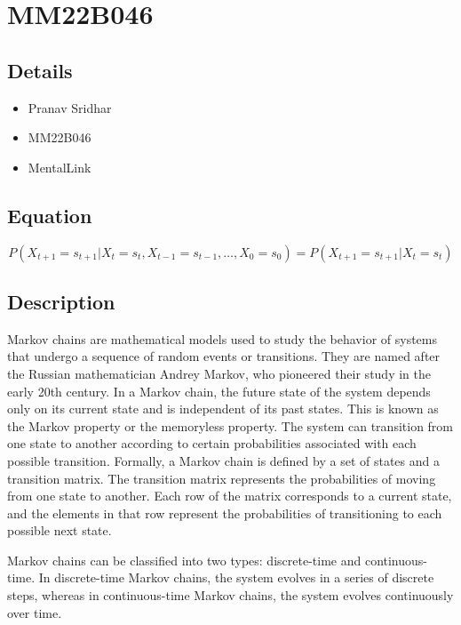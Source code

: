 \documentclass{article}
\begin{document}
\section*{}

\section{MM22B046}
\subsection{Details}

\begin{itemize}
  \item Pranav Sridhar
  \item MM22B046
  \item MentalLink
\end{itemize}
\subsection{Equation}

\begin{equation}
P(X_{t+1}=s_{t+1}|X_{t}=s_{t},X_{t-1}=s_{t-1},\ldots ,X_{0}=s_{0})=P(X_{t+1}=s_{t+1}|X_{t}=s_{t})
\end{equation}

\subsection{Description}
Markov chains are mathematical models used to study the behavior of systems that undergo a sequence of random events or transitions. They are named after the Russian mathematician Andrey Markov, who pioneered their study in the early 20th century.
In a Markov chain, the future state of the system depends only on its current state and is independent of its past states. This is known as the Markov property or the memoryless property. The system can transition from one state to another according to certain probabilities associated with each possible transition.
Formally, a Markov chain is defined by a set of states and a transition matrix. The transition matrix represents the probabilities of moving from one state to another. Each row of the matrix corresponds to a current state, and the elements in that row represent the probabilities of transitioning to each possible next state.

Markov chains can be classified into two types: discrete-time and continuous-time. In discrete-time Markov chains, the system evolves in a series of discrete steps, whereas in continuous-time Markov chains, the system evolves continuously over time. \\
\end{document}
